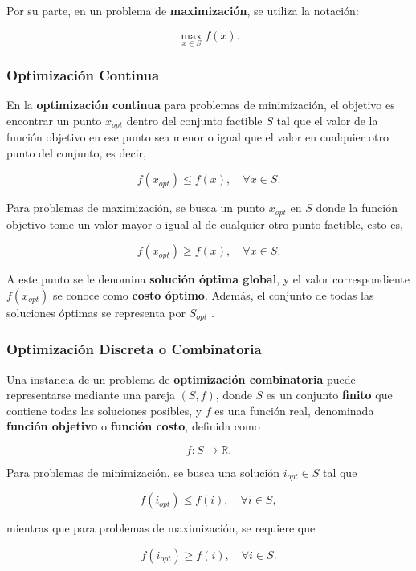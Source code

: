 \documentclass[12pt,titlepage,twoside,openright]{book}
\begin{document}
Por su parte, en un problema de \textbf{maximización}, se utiliza la notación:

\[
	\max_{x \in S} f(x).
\]

\citep{cobos2010}



\subsubsection{Optimización Continua}

En la \textbf{optimización continua} para problemas de minimización, el objetivo es encontrar un punto \( x_{opt} \) dentro del conjunto factible \( S \) tal que el valor de la función objetivo en ese punto sea menor o igual que el valor en cualquier otro punto del conjunto, es decir,

\[
	f(x_{opt}) \leq f(x), \quad \forall x \in S.
\]

Para problemas de maximización, se busca un punto \( x_{opt} \) en \( S \) donde la función objetivo tome un valor mayor o igual al de cualquier otro punto factible, esto es,

\[
	f(x_{opt}) \geq f(x), \quad \forall x \in S.
\]

A este punto se le denomina \textbf{solución óptima global}, y el valor correspondiente \( f(x_{opt}) \) se conoce como \textbf{costo óptimo}. Además, el conjunto de todas las soluciones óptimas se representa por \( S_{opt} \) \citep{cobos2010}.


\subsubsection{Optimización Discreta o Combinatoria}
\label{subsec:opt_discreta}

Una instancia de un problema de \textbf{optimización combinatoria} puede representarse mediante una pareja \((S, f)\), donde \(S\) es un conjunto \textbf{finito} que contiene todas las soluciones posibles, y \(f\) es una función real, denominada \textbf{función objetivo} o \textbf{función costo}, definida como

\[
	f: S \to \mathbb{R}.
\]

Para problemas de minimización, se busca una solución \(i_{opt} \in S\) tal que

\[
	f(i_{opt}) \leq f(i), \quad \forall i \in S,
\]

mientras que para problemas de maximización, se requiere que

\[
	f(i_{opt}) \geq f(i), \quad \forall i \in S.
\]
\end{document}
